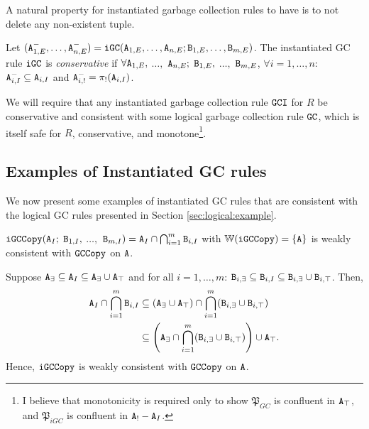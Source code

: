 A natural property for instantiated garbage collection rules to have is to not delete any non-existent tuple.

\begin{property}\label{property:instantiated_gc_conservative}
Let $(\tt{A}_{1,E}^-, \dots, \tt{A}_{n,E}^-) = \tt{iGC}(\tt{A}_{1,E}, \dots, \tt{A}_{n,E}; \tt{B}_{1,E}, \dots, \tt{B}_{m,E})$.
The instantiated GC rule $\tt{iGC}$ is \emph{conservative} if $\forall \tt{A}_{1,E},$ $\dots,$ $\tt{A}_{n,E};$ $\tt{B}_{1,E},$ $\dots,$ $\tt{B}_{m,E}$, $\forall i=1,\dots,n$: $\tt{A}_{i,I}^- \subseteq \tt{A}_{i,I}$ and $\tt{A}_{i,!}^- = \pi_!(\tt{A}_{i,I})$.
\end{property}

We will require that any instantiated garbage collection rule $\tt{GCI}$ for $R$ be conservative and consistent with some logical garbage collection rule $\tt{GC}$, which is itself safe for $R$, conservative, and monotone\footnote{
  I believe that monotonicity is required only to show $\mathfrak{P}_{GC}$ is confluent in $\tt{A}_\top$, and $\mathfrak{P}_{iGC}$ is confluent in $\tt{A}_! - \tt{A}_I$.
}.



\subsection{Examples of Instantiated GC rules}
We now present some examples of instantiated GC rules that are consistent with the logical GC rules presented in Section \ref{sec:logical:example}.

\begin{example}[Copy GC]
$\tt{iGCCopy}(\tt{A}_I;$ $\tt{B}_{1,I},$ $\dots,$ $\tt{B}_{m,I}) = \tt{A}_I \cap \bigcap_{i=1}^m \tt{B}_{i,I}$ with $\mathbb{W}(\tt{iGCCopy}) = \{\tt{A}\}$ is weakly consistent with $\tt{GCCopy}$ on $\tt{A}$.
\end{example}
Suppose
$\tt{A}_\exists \subseteq \tt{A}_I \subseteq \tt{A}_\exists \cup \tt{A}_\top$
and for all $i = 1, \dots, m$:
$\tt{B}_{i,\exists} \subseteq \tt{B}_{i,I} \subseteq \tt{B}_{i,\exists} \cup \tt{B}_{i,\top}$.
Then,
\begin{align*}
\tt{A}_I \cap \bigcap_{i=1}^m \tt{B}_{i,I}
&\subseteq
(\tt{A}_\exists \cup \tt{A}_\top) \cap \bigcap_{i=1}^m (\tt{B}_{i,\exists} \cup \tt{B}_{i,\top})\\
&\subseteq
\left(\tt{A}_\exists \cap \bigcap_{i=1}^m (\tt{B}_{i,\exists} \cup \tt{B}_{i,\top})\right)
\cup
\tt{A}_\top.
\end{align*}
Hence, $\tt{iGCCopy}$ is weakly consistent with $\tt{GCCopy}$ on $\tt{A}$.

